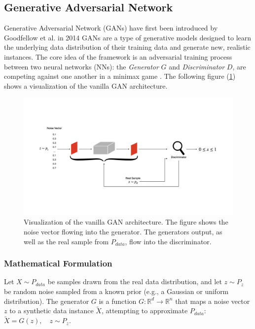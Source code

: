 \subsection[Generative Adversarial Network - GAN]{Generative Adversarial Network}\label{theoretical_gan}
Generative Adversarial Network (GANs) have first been introduced by Goodfellow et al. in 2014 \cite{goodfellow2014generativeadversarialnetworks} GANs are a type of generative models designed to learn the underlying data distribution of their training data and generate new, realistic instances. The core idea of the framework is an adversarial training process between two neural networks (NNs): the \textit{Generator} \(G\) and \textit{Discriminator} \(D\), are competing against one another in a minimax game \cite{VonNeumann1928Minimax}. The following figure (\ref{fig:figure_gan_arch}) shows a visualization of the vanilla GAN architecture.

\begin{figure}[htbp]
    \centering
    \vspace{-4em}
    \includegraphics[width=.9\textwidth]{abb/arch_gan.png}
    \caption{Visualization of the vanilla GAN architecture. The figure shows the noise vector flowing into the generator. The generators output, as well as the real sample from \(P_{data}\), flow into the discriminator.}
    \label{fig:figure_gan_arch}
\end{figure}


\subsubsection{Mathematical Formulation}\label{theoretical_gan_math}
Let \(X \sim P_{data}\) be samples drawn from the real data distribution, and let \(z \sim P_z\) be random noise sampled from a known prior (e.g., a Gaussian or uniform distribution). The generator \(G\) is a function \(G: \mathbb{R}^d \to \mathbb{R}^n\) that maps a noise vector \(z\) to a synthetic data instance \(\tilde{X}\), attempting to approximate \(P_{data}\):\(\tilde{X} = G(z), \quad z \sim P_z.\)


